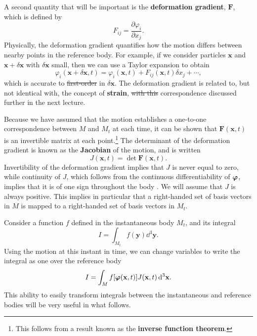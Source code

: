 \documentclass[a4paper,12pt]{paper}
\providecommand{\DIFadd}[1]{{\protect\color{blue}\uwave{#1}}} %
\providecommand{\DIFdel}[1]{{\protect\color{red}\sout{#1}}}                      %
\providecommand{\DIFaddbegin}{} %
\providecommand{\DIFaddend}{} %
\providecommand{\DIFdelbegin}{} %
\providecommand{\DIFdelend}{} %
\begin{document}
A second quantity that will be important is the \textbf{deformation gradient}, $\mathbf{F}$, which is defined by
\begin{equation}
F_{ij}=\frac{\partial\varphi_{i}}{\partial x_{j}}.
\label{eq:3}
\end{equation}
Physically, the deformation gradient quantifies how the motion differs between nearby points in the reference body. For 
example, if we consider particles $\mathbf{x}$ and $\mathbf{x}+\delta\mathbf{x}$ with $\delta\mathbf{x}$ small, then we can 
use a Taylor expansion to obtain
\begin{equation}
\varphi_{i}(\mathbf{x}+\delta\mathbf{x},t)=\varphi_{i}(\mathbf{x},t)+F_{ij}(\mathbf{x},t)\delta x_{j}+\cdots,
\label{eq:4}
\end{equation}
which is accurate to \DIFdelbegin \DIFdel{first-order }\DIFdelend \DIFaddbegin \DIFadd{first order }\DIFaddend in $\delta\mathbf{x}$. The deformation gradient is related to, but not identical with,
the concept of \textbf{strain}, \DIFdelbegin \DIFdel{with this }\DIFdelend \DIFaddbegin \DIFadd{a }\DIFaddend correspondence discussed further in the next lecture.

Because we have assumed that the motion establishes a one-to-one correspondence between $M$ and $M_{t}$ at each time, it can 
be shown that $\mathbf{F}(\mathbf{x},t)$ is an invertible matrix at each point.\footnote{This follows from a result known as 
the \textbf{inverse function theorem}.} The determinant of the deformation gradient is known as the \textbf{Jacobian} of the
motion, and is written
\begin{equation}
J(\mathbf{x},t)=\det\mathbf{F}(\mathbf{x},t).
\label{eq:5}
\end{equation}
Invertibility of the deformation gradient implies that $J$ is never equal to zero, while continuity of $J$, which follows 
from the continuous differentiability of $\bm{\varphi}$, implies that it is of one sign throughout the body \DIFaddbegin \DIFadd{(assumed connected)}\DIFaddend . We will assume that $J$ is always positive. This implies in particular that a right-handed set of 
basis vectors in $M$ is mapped to a right-handed set of basis vectors in $M_{t}$.

Consider a function $f$ defined in the instantaneous body $M_{t}$, and its integral
\begin{equation}
I=\int_{M_{t}}f(\mathbf{y})\dd^{3}\mathbf{y}.
\label{eq:6}
\end{equation}
Using the motion at this instant in time, we can change variables to write the integral as one over the reference body
\begin{equation}
I=\int_{M}f[\bm{\varphi}(\mathbf{x},t)]J(\mathbf{x},t)\,\mathrm{d}^{3}\mathbf{x}.
\label{eq:7}
\end{equation}
This ability to easily transform integrals between the instantaneous and reference bodies will be very useful in what follows.
\end{document}
